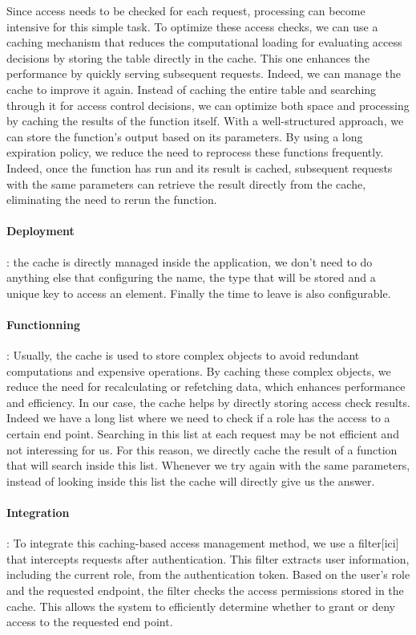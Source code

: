 Since access needs to be checked for each request, processing can become intensive for this simple task. To optimize these access checks, we can use a caching mechanism that reduces the computational loading for evaluating access decisions by storing the table directly in the cache. This one enhances the performance by quickly serving subsequent requests. 
Indeed, we can manage the cache to improve it again. 
Instead of caching the entire table and searching through it for access control decisions, we can optimize both space and processing by caching the results of the function itself. With a well-structured approach, we can store the function's output based on its parameters. By using a long expiration policy, we reduce the need to reprocess these functions frequently. Indeed, once the function has run and its result is cached, subsequent requests with the same parameters can retrieve the result directly from the cache, eliminating the need to rerun the function.


\paragraph{Deployment}: the cache is directly managed inside the application, we don't need to do anything else that configuring the name, the type that will be stored and a unique key to access an element. Finally the time to leave is also configurable. 


\paragraph{Functionning}: Usually, the cache is used to store complex objects to avoid redundant computations and expensive operations. By caching these complex objects, we reduce the need for recalculating or refetching data, which enhances performance and efficiency.  
In our case, the cache helps by directly storing access check results. Indeed we have a long list where we need to check if a role has the access to a certain end point. Searching in this list at each request may be not efficient and not interessing for us. For this reason, we directly cache the result of a function that will search inside this list. Whenever we try again with the same parameters, instead of looking inside this list the cache will directly give us the answer. 



\paragraph{Integration}: To integrate this caching-based access management method, we use a filter[ici] that intercepts requests after authentication. This filter extracts user information, including the current role, from the authentication token. Based on the user's role and the requested endpoint, the filter checks the access permissions stored in the cache. This allows the system to efficiently determine whether to grant or deny access to the requested end point. 
